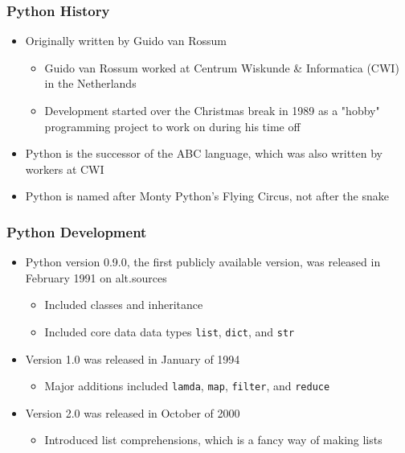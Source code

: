 \documentclass[mini frame in current subsection]{beamer}
\begin{document}
		\begin{frame}
			\frametitle{Python History}
			\begin{itemize}
				\vfill \item  Originally written by Guido van Rossum
					\begin{itemize}
						\item  Guido van Rossum worked at Centrum Wiskunde \& Informatica (CWI) in the Netherlands
						\item Development started over the Christmas break in 1989 as a "hobby" programming project to work on during his time off
					\end{itemize}
				\vfill \item  Python is the successor of the ABC language, which was also written by workers at CWI
				\vfill \item  Python is named after Monty Python's Flying Circus, not after the snake
			\end{itemize}
		\end{frame}
	
		\begin{frame}
			\frametitle{Python Development}
			\begin{itemize}
				\vfill \item  Python version 0.9.0, the first publicly available version, was released in February 1991 on alt.sources
					\begin{itemize}
						\item  Included classes and inheritance
						\item  Included core data data types \texttt{list}, \texttt{dict}, and \texttt{str}
					\end{itemize}
				\vfill \item  Version 1.0 was released in January of 1994
					\begin{itemize}
						\item Major additions included \texttt{lamda}, \texttt{map}, \texttt{filter}, and \texttt{reduce}
					\end{itemize}
				\vfill \item  Version 2.0 was released in October of 2000
					\begin{itemize}
						\item  Introduced list comprehensions, which is a fancy way of making lists
					\end{itemize}
			\end{itemize}
		\end{frame}
	
\end{document}
